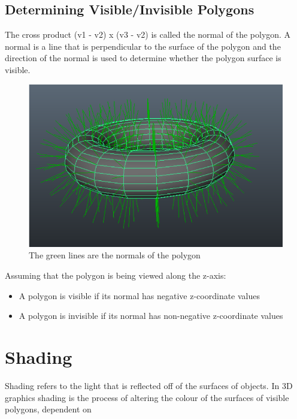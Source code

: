 \documentclass[
]{book}
\providecommand{\tightlist}{%
  \setlength{\itemsep}{0pt}\setlength{\parskip}{0pt}}
\begin{document}
\hypertarget{determining-visibleinvisible-polygons}{%
\subsection{Determining Visible/Invisible Polygons}\label{determining-visibleinvisible-polygons}}

The cross product {(v1 - v2) x (v3 - v2)} is called the normal of the polygon. A normal is a line that is perpendicular to the surface of the polygon and the direction of the normal is used to determine whether the polygon surface is visible.

\begin{figure}
\centering
\includegraphics{img/08-image27.png}
\caption{\label{fig:normal}The green lines are the normals of the polygon}
\end{figure}

Assuming that the polygon is being viewed along the {z-axis}:

\begin{itemize}
\tightlist
\item
  A polygon is {visible} if its {normal has negative z-coordinate values}
\item
  A polygon is {invisible} if its {normal has non-negative z-coordinate values}
\end{itemize}

\hypertarget{shading}{%
\section{Shading}\label{shading}}

Shading refers to the light that is reflected off of the surfaces of objects. In 3D graphics shading is the process of altering the colour of the surfaces of visible polygons, dependent on
\end{document}
